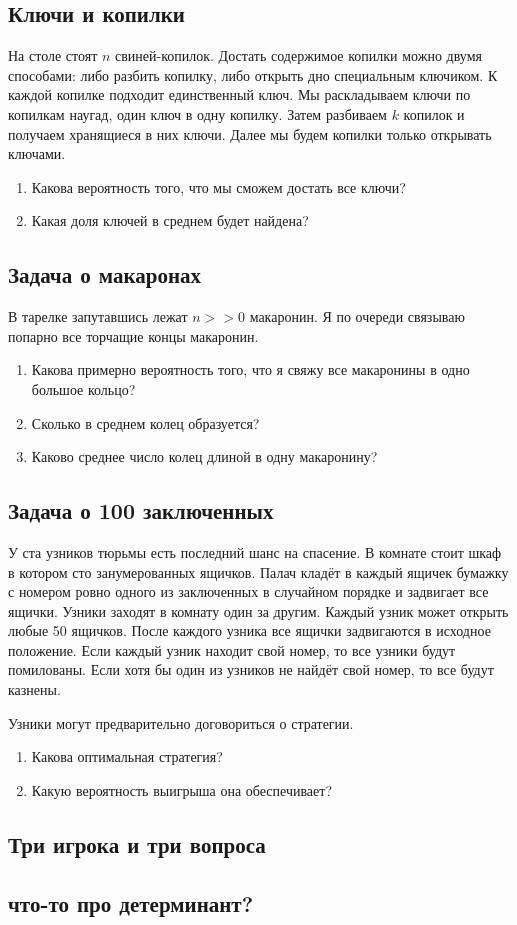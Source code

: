 \documentclass[10pt]{article}
\begin{document}
\subsection{Ключи и копилки}

На столе стоят $n$ свиней-копилок. Достать содержимое копилки можно двумя
способами: либо разбить копилку, либо открыть дно специальным
ключиком. К каждой копилке подходит единственный ключ. Мы раскладываем ключи по
копилкам наугад, один ключ в одну копилку. Затем разбиваем $k$ копилок и получаем хранящиеся в них ключи. Далее мы будем копилки только открывать ключами.
\begin{enumerate}
\item Какова вероятность того, что мы сможем достать все ключи? 
\item Какая доля ключей в среднем будет найдена?
\end{enumerate}

\subsection{Задача о макаронах}

В тарелке запутавшись лежат $n>>0$ макаронин. Я по очереди связываю попарно все торчащие концы макаронин. 

\begin{enumerate}
\item Какова примерно вероятность того, что я свяжу все макаронины в одно большое кольцо?
\item Сколько в среднем колец образуется?
\item Каково среднее число колец длиной в одну макаронину?
\end{enumerate}

\subsection{Задача о 100 заключенных}

У ста узников тюрьмы есть последний шанс на спасение. В комнате стоит шкаф в котором сто занумерованных ящичков. Палач кладёт в каждый ящичек бумажку с номером ровно одного из заключенных в случайном порядке и задвигает все ящички. Узники заходят в комнату один за другим. Каждый узник может открыть любые 50 ящичков. После каждого узника все ящички задвигаются в исходное положение. Если каждый узник находит свой номер, то все узники будут помилованы. Если хотя бы один из узников не найдёт свой номер, то все будут казнены. 

Узники могут предварительно договориться о стратегии.

\begin{enumerate}
\item Какова оптимальная стратегия?
\item Какую вероятность выигрыша она обеспечивает?
\end{enumerate}
  

\subsection{Три игрока и три вопроса}

\subsection{что-то про детерминант?}
\end{document}
